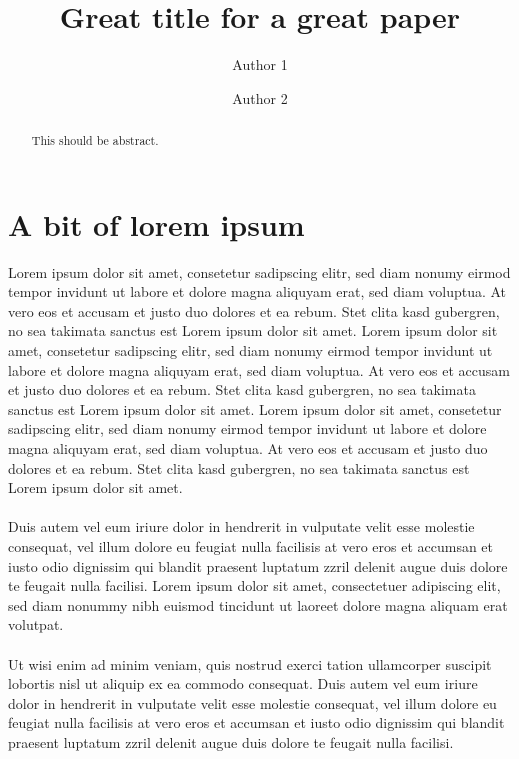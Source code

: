 \documentclass[a4paper,12pt]{amsart}
\title{Great title for a great paper}
\author{Author 1}
\author{Author 2}
\begin{document}
\begin{abstract}
This should be abstract.
\end{abstract}

\maketitle
\tableofcontents

\section{A bit of lorem ipsum}

Lorem ipsum dolor sit amet, consetetur sadipscing elitr, sed diam nonumy eirmod tempor invidunt ut labore et dolore magna aliquyam erat, sed diam voluptua. At vero eos et accusam et justo duo dolores et ea rebum. Stet clita kasd gubergren, no sea takimata sanctus est Lorem ipsum dolor sit amet. Lorem ipsum dolor sit amet, consetetur sadipscing elitr, sed diam nonumy eirmod tempor invidunt ut labore et dolore magna aliquyam erat, sed diam voluptua. At vero eos et accusam et justo duo dolores et ea rebum. Stet clita kasd gubergren, no sea takimata sanctus est Lorem ipsum dolor sit amet. Lorem ipsum dolor sit amet, consetetur sadipscing elitr, sed diam nonumy eirmod tempor invidunt ut labore et dolore magna aliquyam erat, sed diam voluptua. At vero eos et accusam et justo duo dolores et ea rebum. Stet clita kasd gubergren, no sea takimata sanctus est Lorem ipsum dolor sit amet.\\\\   

Duis autem vel eum iriure dolor in hendrerit in vulputate velit esse molestie consequat, vel illum dolore eu feugiat nulla facilisis at vero eros et accumsan et iusto odio dignissim qui blandit praesent luptatum zzril delenit augue duis dolore te feugait nulla facilisi. Lorem ipsum dolor sit amet, consectetuer adipiscing elit, sed diam nonummy nibh euismod tincidunt ut laoreet dolore magna aliquam erat volutpat.\\\\   

Ut wisi enim ad minim veniam, quis nostrud exerci tation ullamcorper suscipit lobortis nisl ut aliquip ex ea commodo consequat. Duis autem vel eum iriure dolor in hendrerit in vulputate velit esse molestie consequat, vel illum dolore eu feugiat nulla facilisis at vero eros et accumsan et iusto odio dignissim qui blandit praesent luptatum zzril delenit augue duis dolore te feugait nulla facilisi.\\\\   
\end{document}
